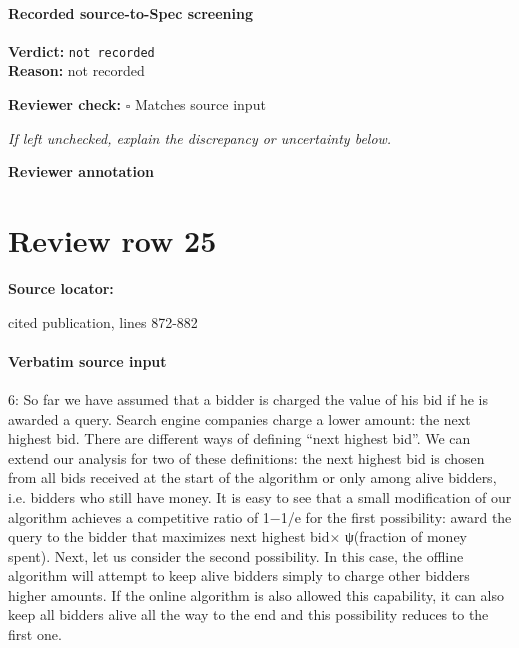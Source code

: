 \documentclass[10pt]{article}
\newcommand{\reviewerbox}{%
  \par\noindent\fbox{\parbox{0.96\linewidth}{\rule{0pt}{0.38in}}}\par
}
\newcommand{\reviewmatch}[1]{%
  \par\noindent\textbf{Reviewer check:} $\square$\; #1\par
  \noindent\emph{If left unchecked, explain the discrepancy or uncertainty below.}\par
}
\begin{document}
\paragraph{Recorded source-to-Spec screening}
\textbf{Verdict:} \texttt{not recorded}
\\
\textbf{Reason:} not recorded
\reviewmatch{Matches source input}
\noindent\textbf{Reviewer annotation}\par
\reviewerbox
\clearpage
\hypertarget{source-claim-bcd3edd2a765f0d2}{}
\section*{Review row 25}
\textbf{Source locator:} {\footnotesize\raggedright cited publication, lines 872-\allowbreak{}882\par}
\paragraph{Verbatim source input}
\begin{ReviewVerbatim}
6: So far we have assumed that a bidder is charged the value of his bid if he is awarded a query.
Search engine companies charge a lower amount: the next highest bid. There are different ways
of defining “next highest bid”. We can extend our analysis for two of these definitions: the
next highest bid is chosen from all bids received at the start of the algorithm or only among
alive bidders, i.e. bidders who still have money.
It is easy to see that a small modification of our algorithm achieves a competitive ratio of
1−1/e for the first possibility: award the query to the bidder that maximizes next highest bid×
ψ(fraction of money spent). Next, let us consider the second possibility. In this case, the offline
algorithm will attempt to keep alive bidders simply to charge other bidders higher amounts.
If the online algorithm is also allowed this capability, it can also keep all bidders alive all the
way to the end and this possibility reduces to the first one.
\end{ReviewVerbatim}
\end{document}
